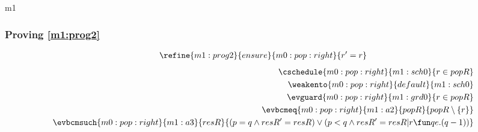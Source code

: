 \documentclass[12pt]{amsart}
\begin{document}
\begin{machine}{m1}
\subsubsection{Proving \ref{m1:prog2}}
\begin{align*}
\refine{m1:prog2}{ensure}{m0:pop:right}{ \index{r}{r' = r} }
\end{align*}
\begin{align*}
\cschedule{m0:pop:right}{m1:sch0}{ r \in popR }
\\ \weakento{m0:pop:right}{default}{m1:sch0}
\\ \evguard{m0:pop:right}{m1:grd0}{ r \in popR }
\\ \evbcmeq{m0:pop:right}{m1:a2}{popR}{ popR \setminus \{ r \} }
\\ \evbcmsuch{m0:pop:right}{m1:a3}{resR}{ (p = q \land resR' = resR) 
	\lor (p < q \land resR' = resR | r \fun qe.(q-1) ) }
\end{align*}



\end{machine}
\end{document}
